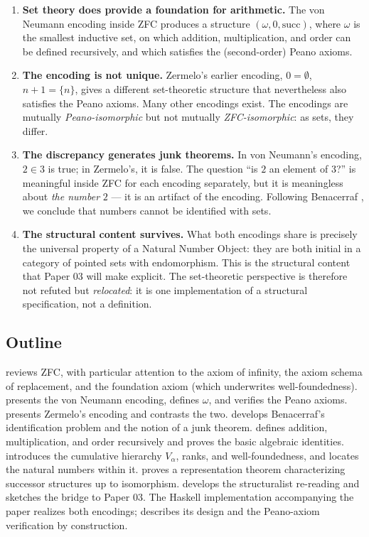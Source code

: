 \documentclass[12pt]{article}
\theoremstyle{definition}
\theoremstyle{remark}
\begin{document}
\begin{enumerate}
\item \textbf{Set theory does provide a foundation for arithmetic.} The von
Neumann encoding inside ZFC produces a structure
$(\omega, 0, \mathrm{succ})$, where $\omega$ is the smallest inductive set, on
which addition, multiplication, and order can be defined recursively, and
which satisfies the (second-order) Peano axioms.

\item \textbf{The encoding is not unique.} Zermelo's earlier encoding,
$0 = \emptyset$, $n+1 = \{n\}$, gives a different set-theoretic structure
that nevertheless also satisfies the Peano axioms. Many other encodings exist.
The encodings are mutually \emph{Peano-isomorphic} but not mutually
\emph{ZFC-isomorphic}: as sets, they differ.

\item \textbf{The discrepancy generates junk theorems.} In von Neumann's
encoding, $2 \in 3$ is true; in Zermelo's, it is false. The question
``is $2$ an element of $3$?'' is meaningful inside ZFC for each
encoding separately, but it is meaningless about \emph{the number} $2$ ---
it is an artifact of the encoding. Following Benacerraf \cite{benacerraf1965},
we conclude that numbers cannot be identified with sets.

\item \textbf{The structural content survives.} What both encodings share
is precisely the universal property of a Natural Number Object: they are both
initial in a category of pointed sets with endomorphism. This is the
structural content that Paper 03 will make explicit. The set-theoretic
perspective is therefore not refuted but \emph{relocated}: it is one
implementation of a structural specification, not a definition.
\end{enumerate}

\subsection{Outline}

 reviews ZFC, with particular attention to the axiom of
infinity, the axiom schema of replacement, and the foundation axiom (which
underwrites well-foundedness).  presents the von Neumann
encoding, defines $\omega$, and verifies the Peano axioms. 
presents Zermelo's encoding and contrasts the two. 
develops Benacerraf's identification problem and the notion of a junk
theorem.  defines addition, multiplication, and order
recursively and proves the basic algebraic identities. 
introduces the cumulative hierarchy $V_\alpha$, ranks, and well-foundedness,
and locates the natural numbers within it.  proves
a representation theorem characterizing successor structures up to
isomorphism.  develops the structuralist re-reading and
sketches the bridge to Paper 03. The Haskell implementation accompanying the
paper realizes both encodings;  describes its design and
the Peano-axiom verification by construction.
\end{document}
